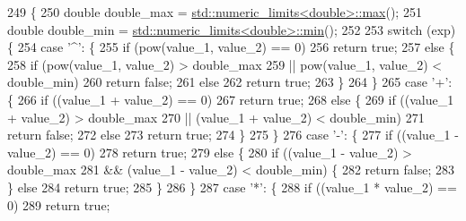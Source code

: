 \begin{DoxyCode}
249                                                                          \{
250     \textcolor{keywordtype}{double} double\_max = \hyperlink{svm_8cpp_a7cba98555a7346b01e4cc06205527d8a}{std::numeric\_limits<double>::max}();
251     \textcolor{keywordtype}{double} double\_min = \hyperlink{svm_8cpp_a348440c5435269ac7c60d2e2d8916f48}{std::numeric\_limits<double>::min}();
252 
253     \textcolor{keywordflow}{switch} (exp) \{
254     \textcolor{keywordflow}{case} \textcolor{charliteral}{'^'}: \{
255         \textcolor{keywordflow}{if} (pow(value\_1, value\_2) == 0)
256             \textcolor{keywordflow}{return} \textcolor{keyword}{true};
257         \textcolor{keywordflow}{else} \{
258             \textcolor{keywordflow}{if} (pow(value\_1, value\_2) > double\_max
259                     || pow(value\_1, value\_2) < double\_min)
260                 \textcolor{keywordflow}{return} \textcolor{keyword}{false};
261             \textcolor{keywordflow}{else}
262                 \textcolor{keywordflow}{return} \textcolor{keyword}{true};
263         \}
264     \}
265     \textcolor{keywordflow}{case} \textcolor{charliteral}{'+'}: \{
266         \textcolor{keywordflow}{if} ((value\_1 + value\_2) == 0)
267             \textcolor{keywordflow}{return} \textcolor{keyword}{true};
268         \textcolor{keywordflow}{else} \{
269             \textcolor{keywordflow}{if} ((value\_1 + value\_2) > double\_max
270                     || (value\_1 + value\_2) < double\_min)
271                 \textcolor{keywordflow}{return} \textcolor{keyword}{false};
272             \textcolor{keywordflow}{else}
273                 \textcolor{keywordflow}{return} \textcolor{keyword}{true};
274         \}
275     \}
276     \textcolor{keywordflow}{case} \textcolor{charliteral}{'-'}: \{
277         \textcolor{keywordflow}{if} ((value\_1 - value\_2) == 0)
278             \textcolor{keywordflow}{return} \textcolor{keyword}{true};
279         \textcolor{keywordflow}{else} \{
280             \textcolor{keywordflow}{if} ((value\_1 - value\_2) > double\_max
281                     && (value\_1 - value\_2) < double\_min) \{
282                 \textcolor{keywordflow}{return} \textcolor{keyword}{false};
283             \} \textcolor{keywordflow}{else}
284                 \textcolor{keywordflow}{return} \textcolor{keyword}{true};
285         \}
286     \}
287     \textcolor{keywordflow}{case} \textcolor{charliteral}{'*'}: \{
288         \textcolor{keywordflow}{if} ((value\_1 * value\_2) == 0)
289             \textcolor{keywordflow}{return} \textcolor{keyword}{true};

\end{DoxyCode}
